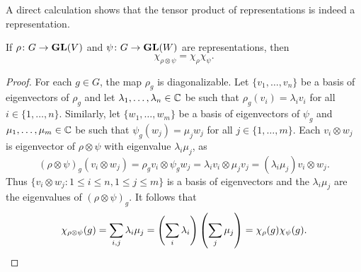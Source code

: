 A direct calculation shows that the tensor product of representations is indeed a representation. 

\begin{proposition}
  	If $\rho\colon G\to\mathbf{GL}(V)$ and
    $\psi\colon G\to\mathbf{GL}(W)$ are representations, then
    \[
    \chi_{\rho\otimes\psi}=\chi_\rho\chi_\psi.
    \]
\end{proposition}

\begin{proof}
	For each $g\in G$, the map $\rho_g$ is diagonalizable. Let $\{v_1,\dots,v_n\}$
	be a basis of eigenvectors of $\rho_g$ and let $\lambda_1,\dots,\lambda_n\in\mathbb{C}$ be such that
	$\rho_g(v_i)=\lambda_iv_i$ for all $i\in\{1,\dots,n\}$. Similarly, 
	let $\{w_1,\dots,w_m\}$ be a basis of 
	eigenvectors of $\psi_g$ and $\mu_1,\dots,\mu_m\in\mathbb{C}$ be such that $\psi_g(w_j)=\mu_jw_j$ for all $j\in\{1,\dots,m\}$. Each 
	$v_i\otimes w_j$ is eigenvector of $\rho\otimes\psi$ with eigenvalue 
	$\lambda_i\mu_j$, as  
	\[
		(\rho\otimes\psi)_g(v_i\otimes w_j)=\rho_gv_i\otimes \psi_gw_j=\lambda_iv_i\otimes \mu_jv_j=(\lambda_i\mu_j)v_i\otimes w_j.
	\]
	Thus  
	$\{v_i\otimes w_j:1\leq i\leq n,1\leq j\leq m\}$ is a basis of eigenvectors and the 
	$\lambda_i\mu_j$ are the eigenvalues of $(\rho\otimes\psi)_g$. It follows that 
	\[
	\chi_{\rho\otimes\psi}(g)
	=\sum_{i,j}\lambda_i\mu_j
	=\left(\sum_i\lambda_i\right)\left(\sum_j\mu_j\right)
	=\chi_\rho(g)\chi_\psi(g).\qedhere 
	\]
\end{proof}


